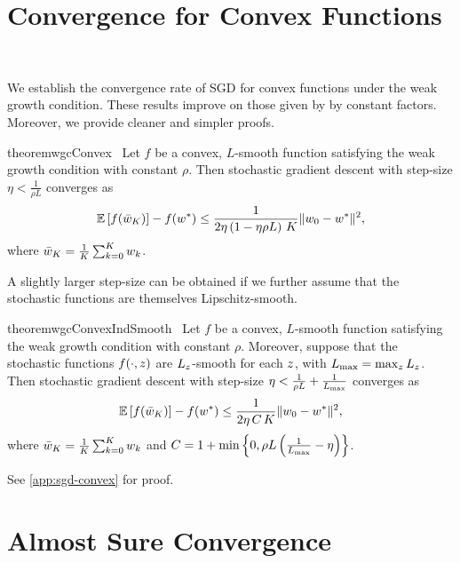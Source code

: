 \section{Convergence for Convex Functions}~\label{sec:sgd-convex}

We establish the convergence rate of SGD for convex functions under the weak growth condition. These results improve on those given by \citet{vaswani2019fast} by constant factors. 
Moreover, we provide cleaner and simpler proofs.


\begin{restatable}{theorem}{wgcConvex}~\label{thm:wgc-convex}
    Let \( f \) be a convex, \( L \)-smooth function satisfying the weak growth condition with constant \( \rho  \).
    Then stochastic gradient descent with step-size \( \eta < \frac{1}{\rho L} \) converges as
    \[ \mathbb{E}\left[f(\bar {w}_K)\right] - f(w^*) \leq \frac{1}{2 \eta \left(1 - \eta \rho L\right) \, K} \|w_0 - w^*\|^2, \]
    where \( \bar {w}_K = \frac{1}{K} \sum_{k=0}^K w_k \). 
\end{restatable}

A slightly larger step-size can be obtained if we further assume that the stochastic functions are themselves Lipschitz-smooth.

\begin{restatable}{theorem}{wgcConvexIndSmooth}~\label{thm:wgc-convex-ind-smooth}
    Let \( f \) be a convex, \( L \)-smooth function satisfying the weak growth condition with constant \( \rho  \).
    Moreover, suppose that the stochastic functions \( f(\cdot, z) \) are \( L_z \)-smooth for each \( z \), with \( L_{\text{max}} = \max_z L_z \).
    Then stochastic gradient descent with step-size \( \eta < \frac{1}{\rho L} + \frac{1}{L_{\text{max}}} \) converges as
    \[ \mathbb{E}\left[f(\bar w_K)\right] - f(w^*) \leq \frac{1}{2\eta \, C \, K} \|w_0 - w^*\|^2,   \]
    where \( \bar {w}_K = \frac{1}{K} \sum_{k=0}^K w_k \) and \( C = 1 + \min \left\{ 0, \rho L \left(\frac{1}{L_{\text{max}}} - \eta \right)\right\} \). 
\end{restatable}

See \autoref{app:sgd-convex} for proof.

\section{Almost Sure Convergence}

